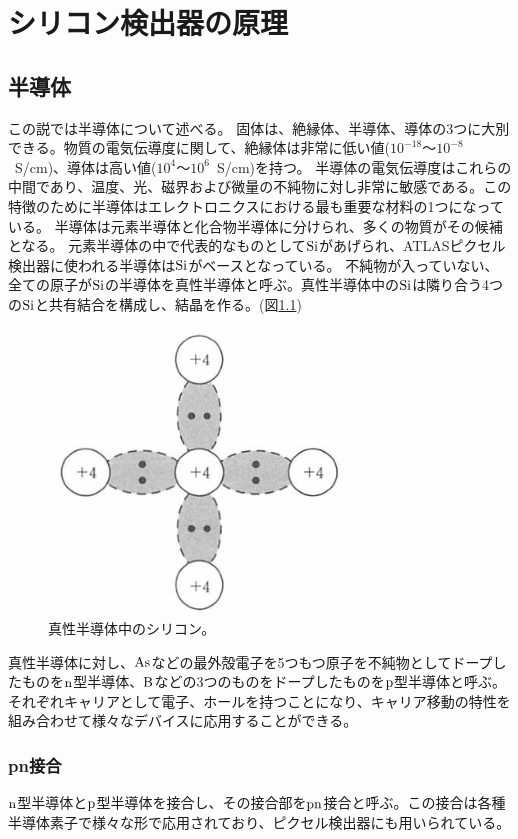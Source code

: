 
\chapter{シリコン検出器の原理}
\section{半導体}
この説では半導体\cite{2-1}について述べる。
固体は、絶縁体、半導体、導体の3つに大別できる。物質の電気伝導度に関して、絶縁体は非常に低い値($10^{-18}〜10^{-8}$~S/cm)、導体は高い値($10^{4}〜10^{6}$~S/cm)を持つ。
半導体の電気伝導度はこれらの中間であり、温度、光、磁界および微量の不純物に対し非常に敏感である。この特徴のために半導体はエレクトロニクスにおける最も重要な材料の1つになっている。
半導体は元素半導体と化合物半導体に分けられ、多くの物質がその候補となる。
元素半導体の中で代表的なものとして$\rm{Si}$があげられ、ATLASピクセル検出器に使われる半導体は$\rm{Si}$がベースとなっている。
不純物が入っていない、全ての原子が$\rm{Si}$の半導体を真性半導体と呼ぶ。真性半導体中の$\rm{Si}$は隣り合う4つの$\rm{Si}$と共有結合を構成し、結晶を作る。(図\ref{pure_silicon})

\begin{figure}[bpt]\centering
\includegraphics[width=8cm]{./pure_silicon.png}
\caption[真性半導体中のシリコン]{真性半導体中のシリコン\cite{2-1}。}
\label{pure_silicon}
\end{figure}

真性半導体に対し、$\rm{As}$などの最外殻電子を5つもつ原子を不純物としてドープしたものを$\rm{n}$型半導体、$\rm{B}$などの3つのものをドープしたものを$\rm{p}$型半導体と呼ぶ。
それぞれキャリアとして電子、ホールを持つことになり、キャリア移動の特性を組み合わせて様々なデバイスに応用することができる。

\subsection{pn接合}
$\rm{n}$型半導体と$\rm{p}$型半導体を接合し、その接合部を$\rm{pn}$接合と呼ぶ。この接合は各種半導体素子で様々な形で応用されており、ピクセル検出器にも用いられている。

